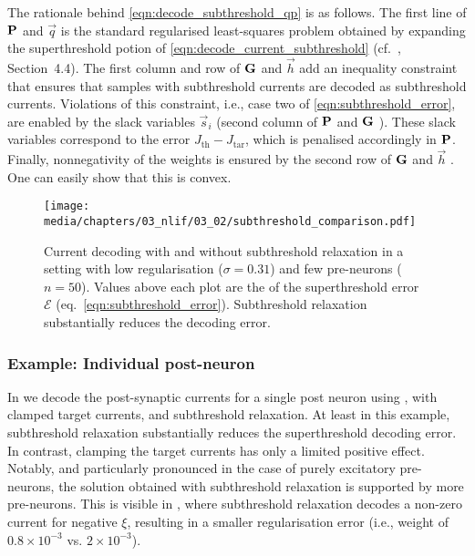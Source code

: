 The rationale behind \cref{eqn:decode_subthreshold_qp} is as follows.
The first line of $\mathbf{P}$ and $\vec q$
is the standard regularised least-squares problem obtained by expanding the superthreshold potion of \cref{eqn:decode_current_subthreshold} (cf.~\cite{boyd2004convex}, Section~4.4).
The first column and row of $\mathbf{G}$ and $\vec h$
add an inequality constraint that ensures that samples with subthreshold currents are decoded as subthreshold currents.
Violations of this constraint, i.e., case two of \cref{eqn:subthreshold_error}, are enabled by the slack variables $\vec s_i$ (second column of $\mathbf{P}$ and $\mathbf{G}$%
).
These slack variables correspond to the error $J_\mathrm{th} - J_\mathrm{tar}$, which is penalised accordingly in $\mathbf{P}$.
Finally, nonnegativity of the weights is ensured by the second row of $\mathbf{G}$ and $\vec h$%
. One can easily show that this \QP is convex.
\endgroup

\begin{figure}
	\texttt{[image: media/chapters/03\_nlif/03\_02/subthreshold\_comparison.pdf]}%
	{\label{fig:subthreshold_comparison_a}}%
	{\label{fig:subthreshold_comparison_b}}%
	{\label{fig:subthreshold_comparison_c}}%
	{\label{fig:subthreshold_comparison_d}}%
	\caption[Current decoding with and without subthreshold relaxation]{Current decoding with and without subthreshold relaxation in a setting with low regularisation ($\sigma = 0.31$) and few pre-neurons ($n = 50$).
	Values above each plot are the \RMS of the superthreshold error ${\mathcal{E}}$ (eq.~\ref{eqn:subthreshold_error}).
	Subthreshold relaxation substantially reduces the decoding error.	
	}
	\label{fig:subthreshold_comparison}
\end{figure}

\subsubsection{Example: Individual post-neuron}
In  we decode the post-synaptic currents for a single post neuron using \NNLS, \NNLS with clamped target currents, and subthreshold relaxation.
At least in this example, subthreshold relaxation substantially reduces the superthreshold decoding error.
In contrast, clamping the target currents has only a limited positive effect.
Notably, and particularly pronounced in the case of purely excitatory pre-neurons, the solution obtained with subthreshold relaxation is supported by more pre-neurons.
This is visible in , where subthreshold relaxation decodes a non-zero current for negative $\xi$, resulting in a smaller regularisation error (i.e., weight \RMS of $0.8 \times 10^{-3}$ vs. $2 \times{10}^{-3}$).


